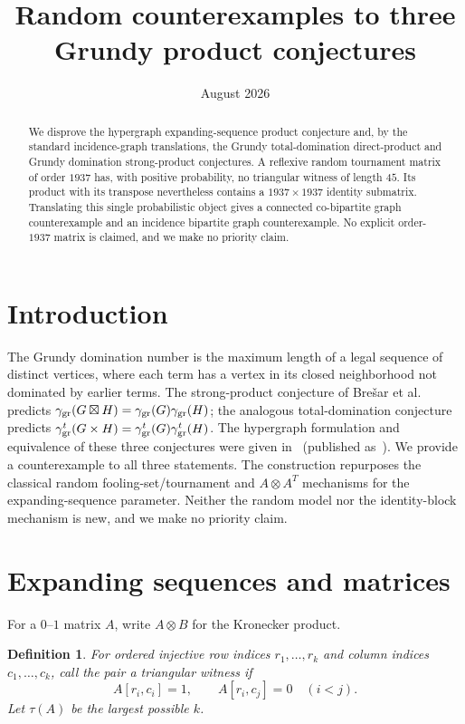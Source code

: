 \documentclass[11pt]{article}
\title{Random counterexamples to three Grundy product conjectures}
\author{}
\date{August 2026}
\newtheorem{definition}[theorem]{Definition}
\newcommand{\gr}{\gamma_{\rm gr}}
\newcommand{\grt}{\gamma_{\rm gr}^{t}}
\newcommand{\timesdir}{\mathbin{\times}}
\begin{document}
\maketitle

\begin{abstract}
We disprove the hypergraph expanding-sequence product conjecture and, by the
standard incidence-graph translations, the Grundy total-domination
direct-product and Grundy domination strong-product conjectures.  A
reflexive random tournament matrix of order $1937$ has, with positive
probability, no triangular witness of length $45$.  Its product with its
transpose nevertheless contains a $1937\times1937$ identity submatrix.
Translating this single probabilistic object gives a connected co-bipartite
graph counterexample and an incidence bipartite graph counterexample.  No
explicit order-$1937$ matrix is claimed, and we make no priority claim.
\end{abstract}

\section{Introduction}

The Grundy domination number is the maximum length of a legal sequence of
distinct vertices, where each term has a vertex in its closed neighborhood
not dominated by earlier terms.  The strong-product conjecture of
Bre{\v{s}}ar et al.~\cite{bresar2016} predicts
\(\gr(G\boxtimes H)=\gr(G)\gr(H)\); the analogous total-domination
conjecture predicts \(\grt(G\timesdir H)=\grt(G)\grt(H)\).
The hypergraph formulation and equivalence of these three conjectures were
given in~\cite{bresar2018} (published as~\cite{bresar2018doi}).  We provide a
counterexample to all three statements.  The construction repurposes the
classical random fooling-set/tournament and $A\otimes A^T$ mechanisms
\cite{pourmoradnasseri2016,friesen2014} for the expanding-sequence parameter.
Neither the random model nor the identity-block mechanism is new, and we make
no priority claim.

\section{Expanding sequences and matrices}

For a $0$--$1$ matrix $A$, write $A\otimes B$ for the Kronecker product.

\begin{definition}
For ordered injective row indices $r_1,\ldots,r_k$ and column indices
$c_1,\ldots,c_k$, call the pair a triangular witness if
\[
A[r_i,c_i]=1,\qquad A[r_i,c_j]=0\quad(i<j).
\]
Let $\tau(A)$ be the largest possible $k$.
\end{definition}
\end{document}
